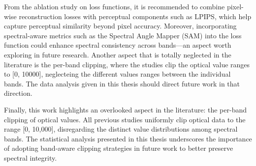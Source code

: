 From the ablation study on loss functions, it is recommended to combine pixel-wise reconstruction losses with perceptual components such as LPIPS, which help capture perceptual similarity beyond pixel accuracy. Moreover, incorporating spectral-aware metrics such as the Spectral Angle Mapper (SAM) into the loss function could enhance spectral consistency across bands—an aspect worth exploring in future research.
Another aspect that is totally neglected in the literature is the per-band clipping, where the studies clip the optical value ranges to [0, 10000], neglecteing the different values ranges between the individual bands. The data analysis given in this thesis should direct future work in that direction.

Finally, this work highlights an overlooked aspect in the literature: the per-band clipping of optical values. All previous studies uniformly clip optical data to the range [0, 10,000], disregarding the distinct value distributions among spectral bands. The statistical analysis presented in this thesis underscores the importance of adopting band-aware clipping strategies in future work to better preserve spectral integrity.